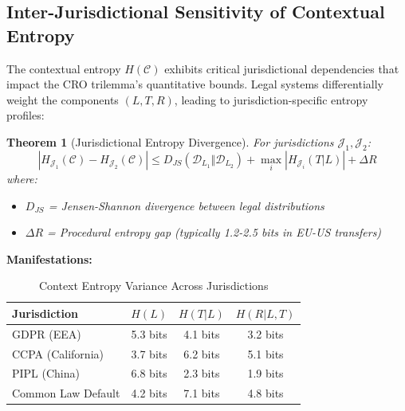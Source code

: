 \documentclass[preprint,12pt]{elsarticle}
\newtheorem{theorem}{Theorem}[section]
\begin{document}
        \subsection{Inter-Jurisdictional Sensitivity of Contextual Entropy}\label{subsec:interjurisdictional_sensitivity}
            The contextual entropy $H(\mathcal{C})$ exhibits critical jurisdictional dependencies that impact the CRO trilemma's quantitative bounds. Legal systems differentially weight the components $(L, T, R)$, leading to jurisdiction-specific entropy profiles:

            \begin{theorem}[Jurisdictional Entropy Divergence]\label{thm:jurisdictional_divergence}
                For jurisdictions $\mathcal{J}_1, \mathcal{J}_2$:
                \begin{equation}\label{eq:jurisdictional_divergence}
                    \left| H_{\mathcal{J}_1}(\mathcal{C}) - H_{\mathcal{J}_2}(\mathcal{C}) \right| \leq D_{JS}(\mathcal{D}_{L_1} \Vert \mathcal{D}_{L_2}) + \max_i \left| H_{\mathcal{J}_i}(T|L) \right| + \Delta R
                \end{equation}
                where:
                \begin{itemize}
                    \item $D_{JS}$ = Jensen-Shannon divergence between legal distributions
                    \item $\Delta R$ = Procedural entropy gap (typically 1.2-2.5 bits in EU-US transfers)
                \end{itemize}
            \end{theorem}

            \textbf{Manifestations:}
            \begin{table}[H]
                \centering
                \caption{Context Entropy Variance Across Jurisdictions}
                \label{tab:jurisdictional_entropy}
                \begin{tabular}{lccc}
                    \toprule
                    \textbf{Jurisdiction} & $H(L)$ & $H(T|L)$ & $H(R|L,T)$ \\
                    \midrule
                    GDPR (EEA) & 5.3 bits & 4.1 bits & 3.2 bits \\
                    CCPA (California) & 3.7 bits & 6.2 bits & 5.1 bits \\
                    PIPL (China) & 6.8 bits & 2.3 bits & 1.9 bits \\
                    Common Law Default & 4.2 bits & 7.1 bits & 4.8 bits \\
                    \bottomrule
                \end{tabular}
            \end{table}
\end{document}
